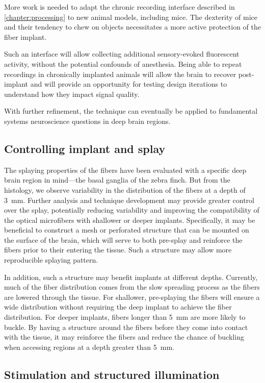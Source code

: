 More work is needed to adapt the chronic recording 
interface described in \cref{chapter:processing} to 
new animal models, including mice. The dexterity of  
mice and their tendency to chew on objects necessitates 
a more active protection of the fiber implant.

Such an interface will allow collecting additional 
sensory-evoked fluorescent activity, without the 
potential confounds of anesthesia. Being able to 
repeat recordings in chronically implanted animals 
will allow the brain to recover post-implant and will 
provide an opportunity for testing design iterations 
to understand how they impact signal quality.

With further refinement, the technique can eventually 
be applied to fundamental systems neuroscience 
questions in deep brain regions.

\subsection{Controlling implant and splay}

The splaying properties of the fibers have been 
evaluated with a specific deep brain region 
in mind---the basal ganglia of the zebra finch.
But from the histology, we observe variability 
in the distribution of the fibers at a depth of 
3~mm. Further analysis and technique development 
may provide greater control over the splay, 
potentially reducing variability and improving 
the compatibility of the optical microfibers with 
shallower or deeper implants. Specifically, it 
may be beneficial to construct a mesh or perforated 
structure that can be mounted on the surface of the 
brain, which will serve to both pre-splay and reinforce 
the fibers prior to their entering the tissue. Such a structure 
may allow more reproducible splaying pattern. 

In addition, such a structure may 
benefit implants at different depths. Currently, 
much of the fiber distribution comes from the slow 
spreading process as the fibers are lowered through
the tissue. For shallower, pre-splaying the fibers 
will ensure a wide distribution without requiring 
the deep implant to achieve the fiber distribution. 
For deeper implants, fibers longer than 5~mm are 
more likely to buckle. By having a structure around 
the fibers before they come into contact with the 
tissue, it may reinforce the fibers and reduce the 
chance of buckling when accessing regions at a depth 
greater than 5~mm.

\subsection{Stimulation and structured illumination}

